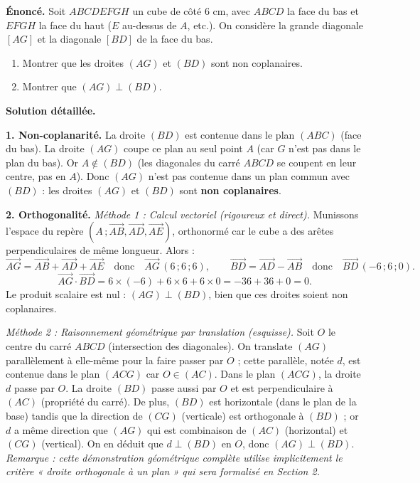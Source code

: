 \documentclass[11pt]{article}
\begin{document}
\begin{exoresolu}
\textbf{Énoncé.} Soit $ABCDEFGH$ un cube de côté $6$ cm, avec $ABCD$ la face du bas et $EFGH$ la face du haut ($E$ au-dessus de $A$, etc.). On considère la grande diagonale $[AG]$ et la diagonale $[BD]$ de la face du bas.
\begin{enumerate}
\item Montrer que les droites $(AG)$ et $(BD)$ sont non coplanaires.
\item Montrer que $(AG) \perp (BD)$.
\end{enumerate}
\tcblower
\textbf{Solution détaillée.}

\textbf{1. Non-coplanarité.}
La droite $(BD)$ est contenue dans le plan $(ABC)$ (face du bas). La droite $(AG)$ coupe ce plan au seul point $A$ (car $G$ n'est pas dans le plan du bas). Or $A \notin (BD)$ (les diagonales du carré $ABCD$ se coupent en leur centre, pas en $A$). Donc $(AG)$ n'est pas contenue dans un plan commun avec $(BD)$ : les droites $(AG)$ et $(BD)$ sont \textbf{non coplanaires}.

\textbf{2. Orthogonalité.}
\emph{Méthode 1 : Calcul vectoriel (rigoureux et direct).}
Munissons l'espace du repère $(A\,;\overrightarrow{AB},\overrightarrow{AD},\overrightarrow{AE})$, orthonormé car le cube a des arêtes perpendiculaires de même longueur. Alors :
\[ \overrightarrow{AG} = \overrightarrow{AB} + \overrightarrow{AD} + \overrightarrow{AE} \quad \text{donc} \quad \overrightarrow{AG}\,(6\,;6\,;6), \qquad \overrightarrow{BD} = \overrightarrow{AD} - \overrightarrow{AB} \quad \text{donc} \quad \overrightarrow{BD}\,(-6\,;6\,;0). \]
\[ \overrightarrow{AG} \cdot \overrightarrow{BD} = 6\times(-6) + 6\times 6 + 6\times 0 = -36 + 36 + 0 = 0. \]
Le produit scalaire est nul : $\boxed{(AG) \perp (BD)}$, bien que ces droites soient non coplanaires.

\emph{Méthode 2 : Raisonnement géométrique par translation (esquisse).}
Soit $O$ le centre du carré $ABCD$ (intersection des diagonales). On translate $(AG)$ parallèlement à elle-même pour la faire passer par $O$ ; cette parallèle, notée $d$, est contenue dans le plan $(ACG)$ car $O \in (AC)$. Dans le plan $(ACG)$, la droite $d$ passe par $O$. La droite $(BD)$ passe aussi par $O$ et est perpendiculaire à $(AC)$ (propriété du carré). De plus, $(BD)$ est horizontale (dans le plan de la base) tandis que la direction de $(CG)$ (verticale) est orthogonale à $(BD)$ ; or $d$ a même direction que $(AG)$ qui est combinaison de $(AC)$ (horizontal) et $(CG)$ (vertical). On en déduit que $d \perp (BD)$ en $O$, donc $(AG) \perp (BD)$. \textit{Remarque : cette démonstration géométrique complète utilise implicitement le critère « droite orthogonale à un plan » qui sera formalisé en Section 2.}
\end{exoresolu}
\end{document}
